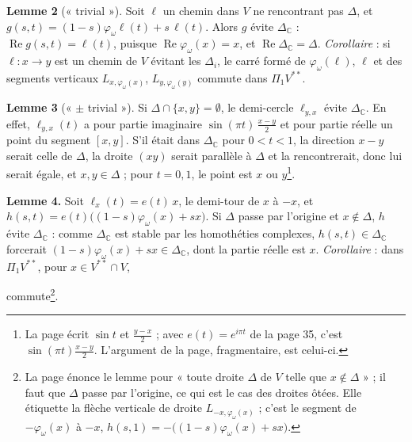\documentclass[11pt,a4paper]{article}
\begin{document}
\textbf{Lemme 2} (« trivial »). Soit $\ell$ un chemin dans $V$ ne rencontrant
pas $\Delta$, et $g(s,t) = (1-s)\varphi_\omega\ell(t) + s\,\ell(t)$. Alors $g$
évite $\Delta_{\mathbb{C}}$ : $\operatorname{Re} g(s,t) = \ell(t)$, puisque
$\operatorname{Re}\varphi_\omega(x) = x$, et $\operatorname{Re}
\Delta_{\mathbb{C}} = \Delta$. \emph{Corollaire} : si $\ell : x \to y$ est un
chemin de $V$ évitant les $\Delta_i$, le carré formé de $\varphi_\omega(\ell)$,
$\ell$ et des segments verticaux $L_{x, \varphi_\omega(x)}$, $L_{y,
\varphi_\omega(y)}$ commute dans $\Pi_1 V^{**}$.

\textbf{Lemme 3} (« $\pm$ trivial »). Si $\Delta \cap \{x, y\} = \emptyset$,
le demi-cercle $\ell_{y,x}$ évite $\Delta_{\mathbb{C}}$. En effet, $\ell_{y,x}(t)$
a pour partie imaginaire $\sin(\pi t)\,\frac{x-y}{2}$ et pour partie réelle un
point du segment $[x,y]$. S'il était dans $\Delta_{\mathbb{C}}$ pour $0 < t <
1$, la direction $x - y$ serait celle de $\Delta$, la droite $(xy)$ serait
parallèle à $\Delta$ et la rencontrerait, donc lui serait égale, et $x, y \in
\Delta$ ; pour $t = 0, 1$, le point est $x$ ou $y$\footnote{La page écrit
$\sin t$ et $\frac{y-x}{2}$ ; avec $e(t) = e^{i\pi t}$ de la page 35, c'est
$\sin(\pi t)\frac{x-y}{2}$. L'argument de la page, fragmentaire, est celui-ci.}.

\textbf{Lemme 4.} Soit $\ell_x(t) = e(t)\,x$, le demi-tour de $x$ à $-x$, et
$h(s,t) = e(t)\bigl((1-s)\varphi_\omega(x) + s x\bigr)$. Si $\Delta$ passe par
l'origine et $x \notin \Delta$, $h$ évite $\Delta_{\mathbb{C}}$ : comme
$\Delta_{\mathbb{C}}$ est stable par les homothéties complexes, $h(s,t) \in
\Delta_{\mathbb{C}}$ forcerait $(1-s)\varphi_\omega(x) + s x \in
\Delta_{\mathbb{C}}$, dont la partie réelle est $x$. \emph{Corollaire} : dans
$\Pi_1 V^{**}$, pour $x \in V^{**} \cap V$,


commute\footnote{La page énonce le lemme pour « toute droite $\Delta$ de $V$
telle que $x \notin \Delta$ » ; il faut que $\Delta$ passe par l'origine,
ce qui est le cas des droites ôtées. Elle étiquette la flèche verticale de
droite $L_{-x, \varphi_\omega(x)}$ ; c'est le segment de $-\varphi_\omega(x)$ à
$-x$, $h(s, 1) = -\bigl((1-s)\varphi_\omega(x) + sx\bigr)$.}.
\end{document}
